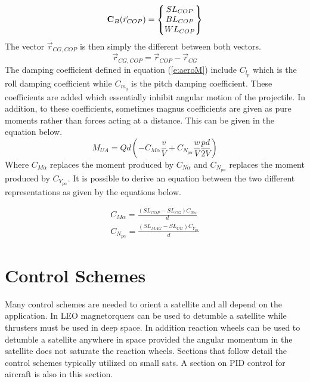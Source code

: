 \documentclass{article}
\begin{document}
\begin{equation}
{\bf C}_B(\vec{r}_{COP}) = \begin{Bmatrix} SL_{COP} \\ BL_{COP} \\ WL_{COP} \end{Bmatrix}
\end{equation}
The vector $\vec{r}_{CG,COP}$ is then simply the different between
both vectors.
\begin{equation}
\vec{r}_{CG,COP} = \vec{r}_{COP}-\vec{r}_{CG}
\end{equation}
The damping coefficient defined in equation (\ref{e:aeroM})
include $C_{l_p}$ which is the roll damping coefficient while $C_{m_q}$ is the pitch damping
coefficient. These coefficients are added which essentially inhibit
angular motion of the projectile. In addition, to these coefficients,
sometimes magnus coefficients are given as pure moments rather 
than forces acting at a distance. This can be given in the equation
below. 
\begin{equation}
M_{UA} = Qd (-C_{M\alpha}\frac{v}{V} + C_{N_{p\alpha}}\frac{w}{V}\frac{pd}{2V})
\end{equation}
Where $C_{M\alpha}$ replaces the moment produced by $C_{N\alpha}$ and
$C_{N_{p\alpha}}$ replaces the moment produced by
$C_{Y_{p\alpha}}$. It is possible to derive an equation between the
two different representations as given by the equations below.

\begin{equation}
\begin{matrix}
C_{M\alpha} = \frac{(SL_{COP}-SL_{CG})C_{N\alpha}}{d} \\
C_{N_{p\alpha}} = \frac{(SL_{MAG}-SL_{CG})C_{Y_{p\alpha}}}{d}
\end{matrix}
\end{equation}

\section{Control Schemes}

Many control schemes are needed to orient a satellite and all depend
on the application. In LEO magnetorquers can be used to detumble a
satellite while thrusters must be used in deep space. In addition
reaction wheels can be used to detumble a satellite anywhere in space
provided the angular momentum in the satellite does not saturate the
reaction wheels. Sections that follow detail the control schemes
typically utilized on small sats. A section on PID control for
aircraft is also in this section.
\end{document}
